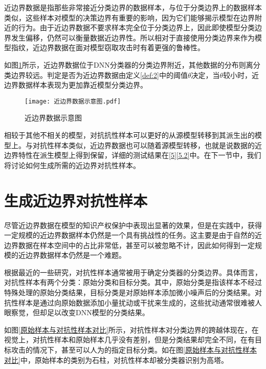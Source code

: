 近边界数据是指那些非常接近分类边界的数据样本，与位于分类边界上的数据样本类似，这些样本对模型的决策边界有重要的影响，因为它们能够揭示模型在边界附近的行为。由于近边界数据不要求样本完全位于分类边界上，因此即使模型分类边界发生偏移，仍然可以衡量数据近边界性。所以相对于直接使用分类边界来作为模型指纹，近边界数据在面对模型窃取攻击时有着更强的鲁棒性。

如图\ref{近边界数据示意图}所示，近边界数据位于DNN分类器的分类边界附近，其他数据的分布则离分类边界较远。判定是否为近边界数据由定义\ref{def:2}中的阈值$\theta$决定，当$\theta$较小时，近边界数据样本表现为更加靠近模型分类边界。

\begin{figure}[htbp]%
	\centering
	\texttt{[image: 近边界数据示意图.pdf]}
	\setlength{\abovecaptionskip}{5mm} %
	\caption{近边界数据示意图}
	\label{近边界数据示意图}
	\end{figure}
	
相较于其他不相关的模型，对抗抗性样本可以更好的从源模型转移到其派生出的模型上。与对抗性样本类似，近边界数据也可以随着源模型转移，也就是说数据的近边界特性在派生模型上得到保留，详细的测试结果在\ref{5}\ref{5.2}中。在下一节中，我们将讨论如何生成所需的近边界对抗性样本。

\section{生成近边界对抗性样本}\label{3.2}

尽管近边界数据在模型的知识产权保护中表现出显著的效果，但是在实践中，获得一定规模的近边界数据样本仍然是一个具有挑战性的任务。这主要是由于自然的近边界数据在样本空间中的占比非常低，甚至可以被忽略不计，因此如何得到一定规模的近边界数据样本仍然是一个难题。

根据最近的一些研究\cite{cao2021ipguard}，对抗性样本通常被用于确定分类器的分类边界。具体而言，对抗性样本有两个分类：原始分类和目标分类。其中，原始分类是指该样本不经过特殊处理的原始分类结果，目标分类是对原始样本添加微小噪声后的分类结果。对抗性样本是通过向原始数据添加小量扰动或干扰来生成的，这些扰动通常很难被人眼察觉，但却足以改变DNN模型的分类结果。

如图\ref{原始样本与对抗性样本对比}所示，对抗性样本对分类边界的跨越体现在，在视觉上，对抗性样本和原始样本几乎没有差别，但是分类结果却完全不同，在有目标攻击的情况下，甚至可以人为的指定目标分类。如在图\ref{原始样本与对抗性样本对比}中，原始样本的类别为石柱，对抗性样本却被分类器识别为高塔。

